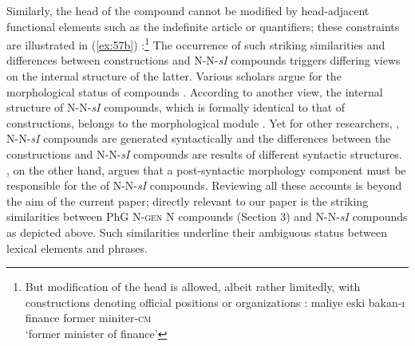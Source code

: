 \documentclass[output=paper]{LSP/langsci}
\begin{document}
Similarly, the head of the compound cannot be modified by head-adjacent functional elements such as the indefinite article or quantifiers; these constraints are illustrated in (\ref{ex:57b}) \citep{Goksel2009}:\footnote{\label{fn:1}But  modification of the head is allowed, albeit rather limitedly, with constructions denoting official positions or organizations \citep{Hayashi1996,Ozsoy2004}:
\ea\label{ex:19i}
	\gll maliye   eski bakan-ı\\
		finance former miniter-\textsc{cm}\\
	\glt `former minister of finance'
\z
}
\ea\label{ex:57}
	\z
\z
The occurrence of such striking similarities and differences between  constructions and N-N-\textit{sI} compounds triggers differing views on the internal structure of the latter. Various scholars argue for the morphological status of  compounds \citep{Schroeder1999,Schaaik2002,AslanAltan2006,Kunduraci2013}. According to another view, the internal structure of  N-N-\textit{sI} compounds, which is formally identical to that of  constructions, belongs to the morphological module \citep{Goksel2009}. Yet for other researchers, \citep{Yukseker1998,Bozsahin2002,Uygun2009,Gurer2010,BagriacikRalli2015,TripsKornfilt2015typology}, N-N-\textit{sI} compounds are generated syntactically and the differences between the  constructions and N-N-\textit{sI} compounds are results of different syntactic structures. \citet{Tat2013}, on the other hand, argues that a post-syntactic morphology component must be responsible for the  of N-N-\textit{sI} compounds. Reviewing all these accounts is beyond the aim of the current paper; directly relevant to our paper is the striking similarities between PhG N-\textsc{gen} N compounds (Section 3) and  N-N-\textit{sI} compounds as depicted above. Such similarities underline their ambiguous status between lexical elements and phrases.
\end{document}
